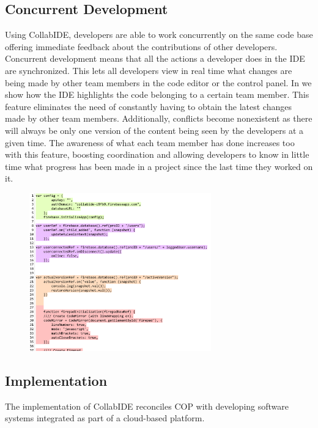 \subsection{Concurrent Development}
Using CollabIDE, developers are able to work concurrently on the same code base offering immediate feedback about the contributions of other developers.
Concurrent development means that all the actions a developer does in the IDE are synchronized. This lets all developers view in real time what changes are being made by other team members in the code editor or the control panel. In  we show how the IDE highlights the code belonging to a certain team member. This feature eliminates the need of constantly having to obtain the latest changes made by other team members. Additionally, conflicts become nonexistent as there will always be only one version of the content being seen by the developers at a given time. The awareness of what each team member has done increases too with this feature, boosting coordination and allowing developers to know in little time what progress has been made in a project since the last time they worked on it. 

\begin{figure}[htbp]
  \centering
  \includegraphics[width=0.7\textwidth]{img/fig2-collabIDEConcurrentProgramming}
  \caption{}
  \label{fig:}
\end{figure}


\subsection{Implementation}
\label{sec:implementation}

The implementation of CollabIDE reconciles \ac{COP} with developing software systems integrated as part of a cloud-based platform.

